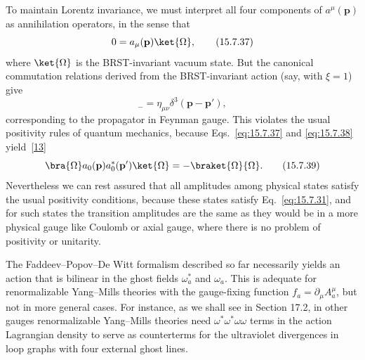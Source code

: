 To maintain Lorentz invariance, we must interpret all four components of $a^\mu(\mathbf p)$ as annihilation operators, in the sense that
\begin{equation}
 0=a_\mu(\mathbf p)\ket{\Omega},
 \tag{15.7.37}\label{eq:15.7.37}
\end{equation}
where $\ket{\Omega}$ is the BRST-invariant vacuum state. But the canonical commutation relations derived from the BRST-invariant action (say, with $\xi=1$) give
\begin{equation}
 [a_\mu(\mathbf p),a_\nu^*(\mathbf p')]_-=\eta_{\mu\nu}\delta^3(\mathbf p-\mathbf p'),
 \tag{15.7.38}\label{eq:15.7.38}
\end{equation}
corresponding to the propagator in Feynman gauge. This violates the usual positivity rules of quantum mechanics, because Eqs.~\eqref{eq:15.7.37} and \eqref{eq:15.7.38} yield~\hyperref[ch15-ref-13]{[13]}
\begin{equation}
 \bra{\Omega}a_0(\mathbf p)a_0^*(\mathbf p')\ket{\Omega}=-\braket{\Omega}{\Omega}.
 \tag{15.7.39}\label{eq:15.7.39}
\end{equation}
Nevertheless we can rest assured that all amplitudes among physical states satisfy the usual positivity conditions, because these states satisfy Eq.~\eqref{eq:15.7.31}, and for such states the transition amplitudes are the same as they would be in a more physical gauge like Coulomb or axial gauge, where there is no problem of positivity or unitarity.

The Faddeev--Popov--De Witt formalism described so far necessarily yields an action that is bilinear in the ghost fields $\omega_a^*$ and $\omega_a$. This is adequate for renormalizable Yang--Mills theories with the gauge-fixing function $f_a=\partial_\mu A_a^\mu$, but not in more general cases. For instance, as we shall see in Section 17.2, in other gauges renormalizable Yang--Mills theories need $\omega^*\omega^*\omega\omega$ terms in the action Lagrangian density to serve as counterterms for the ultraviolet divergences in loop graphs with four external ghost lines.

